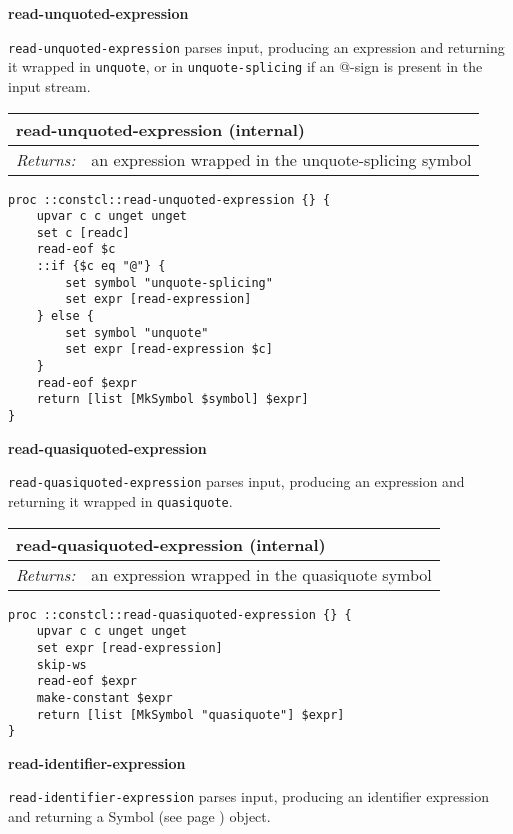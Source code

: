 \documentclass{report}
\begin{document}
\textbf{read-unquoted-expression}


\texttt{read-unquoted-expression} parses input, producing an expression and returning it wrapped in \texttt{unquote}, or in \texttt{unquote-splicing} if an @-sign is present in the input stream.

\begin{tabular}{ |l l| }
\hline
\multicolumn{2}{|l|}{read-unquoted-expression (internal)} \\
\hline
\textit{Returns:} & an expression wrapped in the unquote-splicing symbol \\
\hline
\end{tabular}

\noindent\makebox[\linewidth]{\rule{\linewidth}{0.4pt}}
\begin{lstlisting}
proc ::constcl::read-unquoted-expression {} {
    upvar c c unget unget
    set c [readc]
    read-eof $c
    ::if {$c eq "@"} {
        set symbol "unquote-splicing"
        set expr [read-expression]
    } else {
        set symbol "unquote"
        set expr [read-expression $c]
    }
    read-eof $expr
    return [list [MkSymbol $symbol] $expr]
}
\end{lstlisting}
\noindent\makebox[\linewidth]{\rule{\linewidth}{0.4pt}}

\textbf{read-quasiquoted-expression}


\texttt{read-quasiquoted-expression} parses input, producing an expression and returning it wrapped in \texttt{quasiquote}.

\begin{tabular}{ |l l| }
\hline
\multicolumn{2}{|l|}{read-quasiquoted-expression (internal)} \\
\hline
\textit{Returns:} & an expression wrapped in the quasiquote symbol \\
\hline
\end{tabular}

\noindent\makebox[\linewidth]{\rule{\linewidth}{0.4pt}}
\begin{lstlisting}
proc ::constcl::read-quasiquoted-expression {} {
    upvar c c unget unget
    set expr [read-expression]
    skip-ws
    read-eof $expr
    make-constant $expr
    return [list [MkSymbol "quasiquote"] $expr]
}
\end{lstlisting}
\noindent\makebox[\linewidth]{\rule{\linewidth}{0.4pt}}

\textbf{read-identifier-expression}


\texttt{read-identifier-expression} parses input, producing an identifier expression and returning a Symbol (see page \pageref{symbols}) object.
\end{document}
